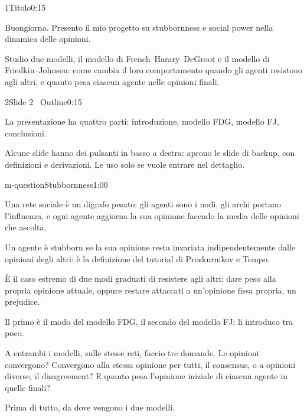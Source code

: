 
\begin{slidepag}{1}{Titolo}{0:15}
  \begin{discorso}
    \item Buongiorno. Presento il mio progetto su stubbornness e social power nella dinamica delle opinioni.
    \item Studio due modelli, il modello di French–Harary–DeGroot e il modello di Friedkin–Johnsen: come cambia il loro comportamento quando gli agenti resistono agli altri, e quanto pesa ciascun agente nelle opinioni finali.
  \end{discorso}
\end{slidepag}

\begin{slidepag}{2}{Slide 2 \textperiodcentered\ Outline}{0:15}
  \begin{discorso}
    \item La presentazione ha quattro parti: introduzione, modello FDG, modello FJ, conclusioni.
    \item Alcune slide hanno dei pulsanti in basso a destra: aprono le slide di backup, con definizioni e derivazioni. Le uso solo se vuole entrare nel dettaglio.
  \end{discorso}
\end{slidepag}

\begin{slide}{m-question}{Stubbornness}{1:00}
  \begin{discorso}
    \item Una rete sociale è un digrafo pesato: gli agenti sono i nodi, gli archi portano l'influenza, e ogni agente aggiorna la sua opinione facendo la media delle opinioni che ascolta.
    \item Un agente è stubborn se la sua opinione resta invariata indipendentemente dalle opinioni degli altri: è la definizione del tutorial di Proskurnikov e Tempo.
    \item È il caso estremo di due modi graduati di resistere agli altri: dare peso alla propria opinione attuale, oppure restare attaccati a un'opinione fissa propria, un prejudice.
    \item Il primo è il modo del modello FDG, il secondo del modello FJ: li introduco tra poco.
    \item A entrambi i modelli, sulle stesse reti, faccio tre domande. Le opinioni convergono? Convergono alla stessa opinione per tutti, il consensus, o a opinioni diverse, il disagreement? E quanto pesa l'opinione iniziale di ciascun agente in quelle finali?
    \item Prima di tutto, da dove vengono i due modelli.
  \end{discorso}
\end{slide}


